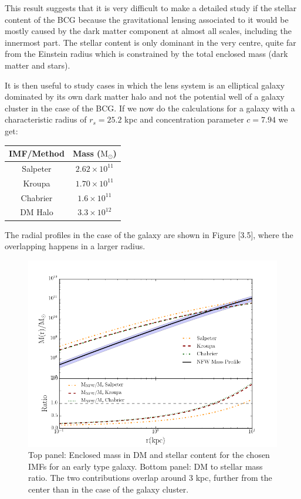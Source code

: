This result suggests that it is very difficult to make a detailed study if the stellar content of the BCG because the gravitational lensing associated to it would be mostly caused by the dark matter component at almost all scales, including the innermost part. The stellar content is only dominant in the very centre, quite far from the Einstein radius which is constrained by the total enclosed mass (dark matter and stars).

It is then useful to study cases in which the lens system is an elliptical galaxy dominated by its own dark matter halo and not the potential well of a galaxy cluster in the case of the BCG. If we now do the calculations for a galaxy with a characteristic radius of $r_s=25.2$ kpc and concentration parameter $c=7.94$ we get:

\begin{center}
\begin{tabular}{c c}
IMF/Method & Mass ($\text{M}_{\odot}$)\tabularnewline
\hline 
\hline
Salpeter & $2.62\times10^{11}$\tabularnewline
Kroupa & $1.70\times10^{11}$\tabularnewline
Chabrier & $1.6\times10^{11}$\tabularnewline
DM Halo & $3.3\times10^{12}$\tabularnewline
\end{tabular}
\end{center}

The radial profiles in the case of the galaxy are shown in Figure [3.5], where the overlapping happens in a larger radius.

\begin{figure}[H]
\centering
\includegraphics[width=12cm]{images/DM_fraction_all_IMFs_galaxy.png}
\caption[DM and Stellar mass profiles for a massive early type galaxy.]{Top panel: Enclosed mass in DM and stellar content for the chosen IMFs for an early type galaxy. Bottom panel: DM to stellar mass ratio. The two contributions overlap around 3 kpc, further from the center than in the case of the galaxy cluster.}
\end{figure}

